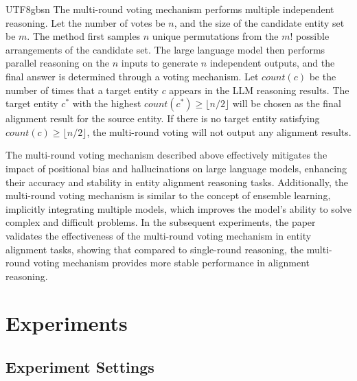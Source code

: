 \documentclass[preprint,12pt]{elsarticle}
\begin{document}
\begin{CJK}{UTF8}{gbsn}
The multi-round voting mechanism performs multiple independent reasoning. Let the number of votes be $n$, and the size of the candidate entity set be $m$. The method first samples $n$ unique permutations from the $m!$ possible arrangements of the candidate set. The large language model then performs parallel reasoning on the $n$ inputs to generate $n$ independent outputs, and the final answer is determined through a voting mechanism. Let $count(c)$ be the number of times that a target entity $c$ appears in the LLM reasoning results. The target entity $c^{*}$ with the highest $count(c^{*})\geq \lfloor n / 2 \rfloor$ will be chosen as the final alignment result for the source entity. If there is no target entity satisfying $count(c)\geq \lfloor n / 2 \rfloor$, the multi-round voting will not output any alignment results. 

The multi-round voting mechanism described above effectively mitigates the impact of positional bias and hallucinations on large language models, enhancing their accuracy and stability in entity alignment reasoning tasks. Additionally, the multi-round voting mechanism is similar to the concept of ensemble learning, implicitly integrating multiple models, which improves the model's ability to solve complex and difficult problems. In the subsequent experiments, the paper validates the effectiveness of the multi-round voting mechanism in entity alignment tasks, showing that compared to single-round reasoning, the multi-round voting mechanism provides more stable performance in alignment reasoning.


\section{Experiments}
\label{sec:EXPERIMENTS}
\subsection{Experiment Settings}

\end{CJK}
\end{document}
